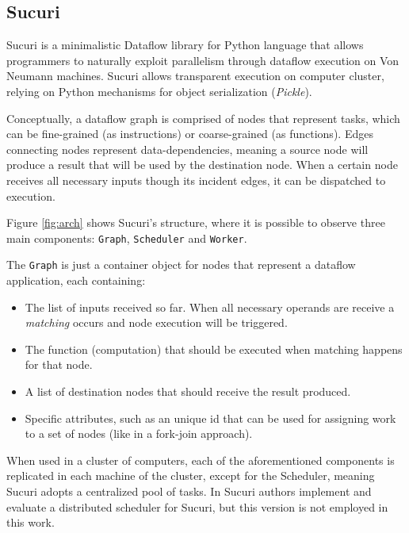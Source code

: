 \subsection{Sucuri} \label{sect:sucuri}

Sucuri \cite{sucuri-original} is a minimalistic Dataflow library for Python language that allows programmers to naturally exploit parallelism through dataflow execution on Von Neumann machines. Sucuri allows transparent execution on computer cluster, relying on Python mechanisms for object serialization (\emph{Pickle}).

Conceptually, a dataflow graph is comprised of nodes that represent tasks, which can be fine-grained (as instructions) or coarse-grained (as functions). Edges connecting nodes represent data-dependencies, meaning a source node will produce a result that will be used by the destination node. When a certain node receives all necessary inputs though its incident edges, it can be dispatched to execution.

Figure \ref{fig:arch} shows Sucuri's structure, where it is possible to observe three main components: \texttt{Graph}, \texttt{Scheduler} and \texttt{Worker}. 

The \texttt{Graph} is just a container object for nodes that represent a dataflow application, each containing:
\begin{itemize}
    \item The list of inputs received so far. When all necessary operands are receive a \emph{matching} occurs and node execution will be triggered.
    \item The function (computation) that should be executed when matching happens for that node.
    \item A list of destination nodes that should receive the result produced.
    \item Specific attributes, such as an unique id that can be used for assigning work to a set of nodes (like in a fork-join approach).
\end{itemize}

When used in a cluster of computers, each of the aforementioned components is replicated in each machine of the cluster, except for the Scheduler, meaning Sucuri adopts a centralized pool of tasks. In \cite{sucuri-distribuida} Sucuri authors implement and evaluate a distributed scheduler for Sucuri, but this version is not employed in this work.

